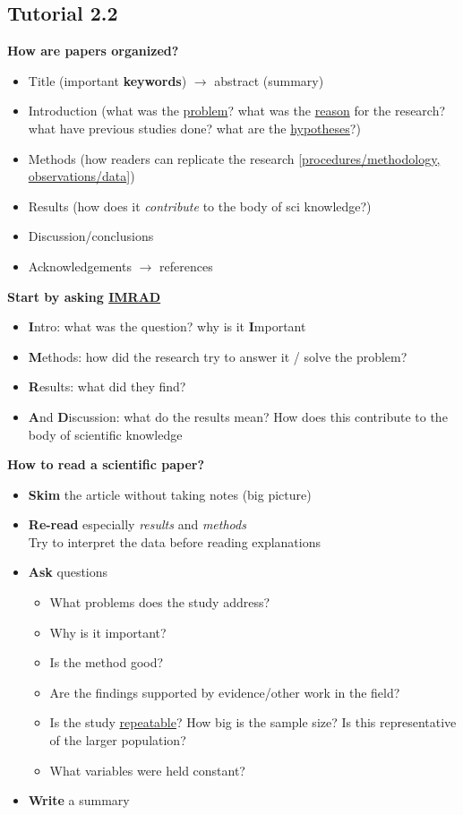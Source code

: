 \documentclass{article}
\begin{document}
\begin{multicols}{2}
\subsection{Tutorial 2.2}

\textbf{How are papers organized?}
\begin{itemize}
	\item Title (important \textbf{keywords}) $\rightarrow$ abstract (summary)
	\item Introduction (what was the \underline{problem}? what was the \underline{reason} for the research? what have previous studies done? what are the \underline{hypotheses}?)
	\item Methods (how readers can replicate the research [\underline{procedures/methodology, observations/data}])
	\item Results (how does it \textit{contribute} to the body of sci knowledge?)
	\item Discussion/conclusions
	\item Acknowledgements $\rightarrow$ references \\
\end{itemize}
\textbf{Start by asking \underline{IMRAD}}
\begin{itemize}
	\item \textbf{I}ntro: what was the question? why is it \textbf{I}mportant
	\item \textbf{M}ethods: how did the research try to answer it / solve the problem?
	\item \textbf{R}esults: what did they find?
	\item \textbf{A}nd \textbf{D}iscussion: what do the results mean? How does this contribute to the body of scientific knowledge
\end{itemize}
\textbf{How to read a scientific paper?}
\begin{itemize}
	\item \textbf{Skim} the article without taking notes (big picture)
	\item \textbf{Re-read} especially \textit{results} and \textit{methods}\\
	Try to interpret the data before reading explanations
	\item \textbf{Ask} questions
	\begin{itemize}
		\item What problems does the study address?
		\item Why is it important?
		\item Is the method good?
		\item Are the findings supported by evidence/other work in the field?
		\item Is the study \underline{repeatable}? How big is the sample size? Is this representative of the larger population?
		\item What variables were held constant?
	\end{itemize}
	\item \textbf{Write} a summary\\
\end{itemize}


\end{multicols}
\end{document}
